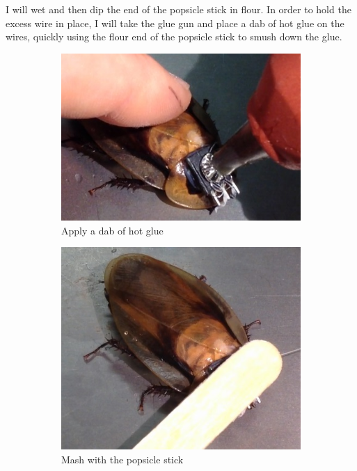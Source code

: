 I will wet and then dip the end of the popsicle stick in flour. In order to hold the excess wire in place, I will take the glue gun and place a dab of hot glue on the wires, quickly using the flour end of the popsicle stick to smush down the glue. 
\begin{figure}[ht!]
\centering
    \begin{subfigure}{.5\textwidth}
    \centering
    \includegraphics[scale=0.3]{Surgery Photos/gluewires.jpg}
    \caption{Apply a dab of hot glue}
    \label{fig:gluewires}
    \end{subfigure}
    \begin{subfigure}{.5\textwidth}
    \centering
    \includegraphics[scale=0.3]{Surgery Photos/gluewires1.jpg}
    \caption{Mash with the popsicle stick}
    \label{fig:gluewires1}
    \end{subfigure}
    \begin{subfigure}{.5\textwidth}
    \centering

\end{subfigure}
\end{figure}
